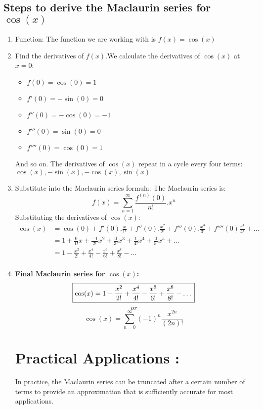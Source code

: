 \documentclass[11pt,a4paper]{article}
\begin{document}
\subsection{Steps to derive the Maclaurin series for $\cos(x)$}
\begin{enumerate}
\item Function: The function we are working with is $f(x)=\cos(x)$
\item Find the derivatives of $f(x)$.We calculate the derivatives of $\cos(x)$ at $x=0$:
\begin{itemize}
    \item $f(0)=\cos(0)=1$
    \item $f'(0)=-\sin(0)=0$
    \item $f''(0)=-\cos(0)=-1$
    \item $f'''(0)=\sin(0)=0$
    \item $f''''(0)=\cos(0)=1$
\end{itemize}
And so on. The derivatives of $\cos(x)$ repeat in a cycle every four terms:\\
$\cos(x),-\sin(x),-\cos(x),\sin(x)$
\item Substitute into the Maclaurin series formula: The Maclaurin series is:$$f(x)=\sum_{n=1}^{\infty}
\frac{f^{(n)}(0)}{n!}.x^n$$
Substituting the derivatives of $\cos(x)$:
\begin{align*}
    \cos(x)&=\cos(0)+f'(0).\frac{x}{1!}+f''(0).\frac{x^2}{2!}+f'''(0).\frac{x^3}{3!}+f''''(0)\frac{x^4}{4!}+\dots\\
    &=1+\frac{0}{1!}x+\frac{-1}{2!}x^2+\frac{0}{3!}x^3+\frac{1}{4!}x^4+\frac{0}{5!}x^5+\dots\\
    &=1-\frac{x^2}{2!}+\frac{x^4}{4!}-\frac{x^6}{6!}+\frac{x^8}{8!}-\dots\\
\end{align*}
\item\textbf{Final Maclaurin series for $\cos(x)$:}
$$\boxed{\cos(x)=1-\frac{x^2}{2!}+\frac{x^4}{4!}-\frac{x^6}{6!}+\frac{x^8}{8!}-\dots\\}$$
$$or$$
$$\boxed{\cos(x)=\sum_{n=0}^{\infty}(-1)^n\frac{x^{2n}}{(2n)!}}$$
\pagebreak
\section{Practical Applications :}
In practice, the Maclaurin series can be truncated after a certain number of terms to provide an approximation that is sufficiently accurate for most applications.

\end{enumerate}
\end{document}
